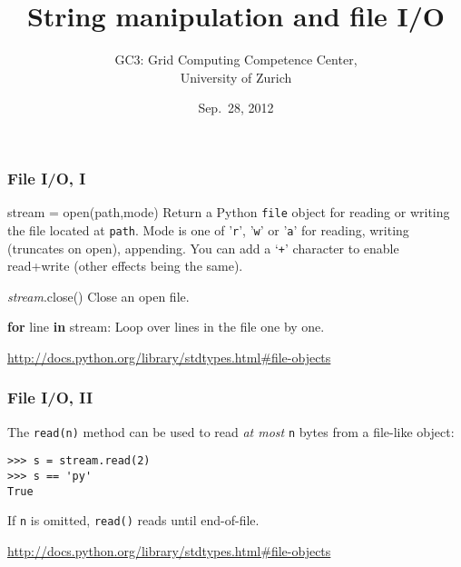 \documentclass[english,serif,mathserif,xcolor=pdftex,dvipsnames,table]{beamer}
\title[Part 4]{%
  String manipulation and file I/O
}
\author[GC3]{%
  GC3: Grid Computing Competence Center, \\
  University of Zurich
}
\date{Sep.~28, 2012}
\begin{document}
\maketitle

\begin{frame}[fragile]
  \frametitle{File I/O, I}

  \begin{describe}{\ttfamily stream = open(path,mode)}
    Return a Python \texttt{file} object for reading or writing the
    file located at \texttt{path}.  Mode is one of '\texttt{r}',
    '\texttt{w}' or '\texttt{a}' for reading, writing (truncates on open), appending.
    You can add a `\texttt{+}' character to enable read+write (other
    effects being the same).
  \end{describe}

  \begin{describe}{\ttfamily \emph{stream}.close()}
    Close an open file.
  \end{describe}
  
  \begin{describe}{\ttfamily \textbf{for} line \textbf{in} stream:}
    Loop over lines in the file one by one.
  \end{describe}

  \begin{references}
    \url{http://docs.python.org/library/stdtypes.html#file-objects}
  \end{references}
\end{frame}


\begin{frame}[fragile]
  \frametitle{File I/O, II}

  The \lstinline|read(n)| method can be used to read \emph{at most}
  \lstinline|n| bytes from a file-like object:
\begin{lstlisting}
>>> s = stream.read(2)
>>> s == 'py'
True
\end{lstlisting}
  If \lstinline|n| is omitted, \texttt{read()} reads until end-of-file.

  \begin{references}
    \url{http://docs.python.org/library/stdtypes.html#file-objects}
  \end{references}
\end{frame}


\begin{frame}[fragile]

\end{frame}
\end{document}
